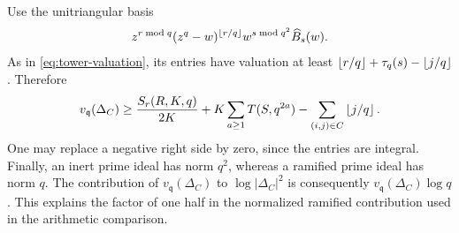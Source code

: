 Use the unitriangular basis
\[
 z^{r\bmod q}(z^q-w)^{\left\lfloor r/q\right\rfloor}
 w^{s\bmod q^2}\widehat B_s(w).
\]
As in \eqref{eq:tower-valuation}, its entries have valuation at least
$\left\lfloor r/q\right\rfloor+\tau_q(s)-\left\lfloor j/q\right\rfloor$. Therefore
\begin{equation}\label{eq:local-ramified}
 v_{\mathfrak q}(\Delta_C)\geq
 \frac{S_r(R,K,q)}{2K}+K\sum_{a\geq1}T(S,q^{2a})
 -\sum_{(i,j)\in C}\left\lfloor j/q\right\rfloor.
\end{equation}
One may replace a negative right side by zero, since the entries are
integral. Finally, an inert prime ideal has norm $q^2$, whereas a ramified
prime ideal has norm $q$. The contribution of
$v_{\mathfrak q}(\Delta_C)$ to $\log|\Delta_C|^2$ is consequently
$v_{\mathfrak q}(\Delta_C)\log q$. This explains the factor of one half
in the normalized ramified contribution used in the arithmetic comparison.
